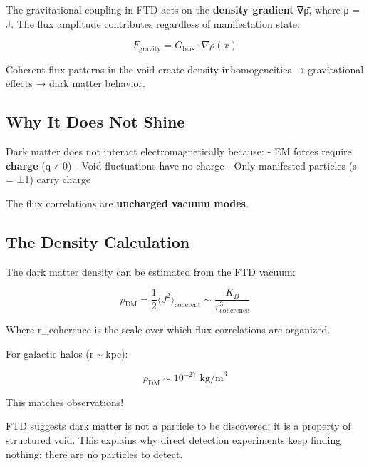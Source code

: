 \documentclass[
  11pt,
  letterpaper,
  twoside,
  openright]{book}
\begin{document}
The gravitational coupling in FTD acts on the \textbf{density gradient}
∇ρ̄, where ρ = \textbar J\textbar. The flux amplitude contributes
regardless of manifestation state:

\[F_{\text{gravity}} = G_{\text{bias}} \cdot \nabla\bar{\rho}(x)\]

Coherent flux patterns in the void create density inhomogeneities →
gravitational effects → dark matter behavior.

\subsection{Why It Does Not Shine}\label{why-it-does-not-shine}

Dark matter does not interact electromagnetically because: - EM forces
require \textbf{charge} (q ≠ 0) - Void fluctuations have no charge -
Only manifested particles (s = ±1) carry charge

The flux correlations are \textbf{uncharged vacuum modes}.

\subsection{The Density Calculation}\label{the-density-calculation}

The dark matter density can be estimated from the FTD vacuum:

\[\rho_{\text{DM}} = \frac{1}{2} \langle J^2 \rangle_{\text{coherent}} \sim \frac{K_B}{r_{\text{coherence}}^3}\]

Where r\_coherence is the scale over which flux correlations are
organized.

For galactic halos (r \textasciitilde{} kpc):

\[\rho_{\text{DM}} \sim 10^{-27} \text{ kg/m}^3\]

This matches observations!

\begin{tcolorbox}[enhanced jigsaw, coltitle=black, colbacktitle=quarto-callout-important-color!10!white, toprule=.15mm, colframe=quarto-callout-important-color-frame, arc=.35mm, opacityback=0, bottomtitle=1mm, toptitle=1mm, breakable, colback=white, titlerule=0mm, opacitybacktitle=0.6, title=\textcolor{quarto-callout-important-color}{\faExclamation}\hspace{0.5em}{A New Paradigm}, rightrule=.15mm, bottomrule=.15mm, leftrule=.75mm, left=2mm]

FTD suggests dark matter is not a particle to be discovered: it is a
property of structured void. This explains why direct detection
experiments keep finding nothing: there are no particles to detect.

\end{tcolorbox}
\end{document}
